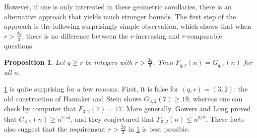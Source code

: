 \documentclass[11pt,reqno]{amsart}
\newtheorem{proposition}[theorem]{Proposition}
\theoremstyle{definition}
\newcommand\1{\mathbf{1}}
\let\leq\leqslant
\let\geq\geqslant
\begin{document}
However, if one is only interested in these geometric corollaries, there is an alternative approach that yields much stronger bounds. The first step of the approach is the following surprisingly simple observation, which shows that when $r>\frac{2q}3$, there is no difference between the $r$-increasing and $r$-comparable questions.

\begin{proposition}\label{prop:F=G}
    Let $q\geq r$ be integers with $r>\frac{2q}3$. Then $F_{q,r}(n)=G_{q,r}(n)$ for all $n$. 
\end{proposition}


\cref{prop:F=G} is quite surprising for a few reasons. First, it is false for $(q,r)=(3,2)$: the old construction of Hamaker and Stein shows $G_{3,2}(7)\geq 19$, whereas one can check by computer that $F_{3,2}(7)= 17$. More generally, Gowers and Long proved that $G_{3,2}(n) \geq n^{1.54}$, and they conjectured that $F_{3,2}(n) \leq n^{3/2}$. These facts also suggest that the requirement $r>\frac{2q}3$ in \cref{prop:F=G} is best possible. 
\end{document}
